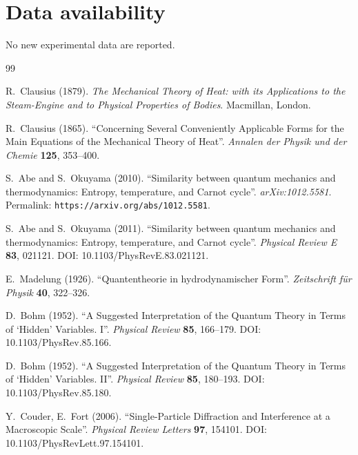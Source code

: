 \documentclass[pdflatex,sn-mathphys-num]{revtex4-2}
\begin{document}
    \backmatter

    \section*{Data availability}
    No new experimental data are reported.

    \begin{thebibliography}{99}

        R.~Clausius (1879).
        \textit{The Mechanical Theory of Heat: with its Applications to the Steam-Engine and to Physical Properties of Bodies}.
        Macmillan, London.

        R.~Clausius (1865).
        ``Concerning Several Conveniently Applicable Forms for the Main Equations of the Mechanical Theory of Heat''.
        \textit{Annalen der Physik und der Chemie} \textbf{125}, 353--400.

        S.~Abe and S.~Okuyama (2010).
        ``Similarity between quantum mechanics and thermodynamics: Entropy, temperature, and Carnot cycle''.
        \textit{arXiv:1012.5581}.
        Permalink: \texttt{https://arxiv.org/abs/1012.5581}.

        S.~Abe and S.~Okuyama (2011).
        ``Similarity between quantum mechanics and thermodynamics: Entropy, temperature, and Carnot cycle''.
        \textit{Physical Review E} \textbf{83}, 021121.
        DOI: 10.1103/PhysRevE.83.021121.

        E.~Madelung (1926).
        ``Quantentheorie in hydrodynamischer Form''.
        \textit{Zeitschrift f\"ur Physik} \textbf{40}, 322--326.

        D.~Bohm (1952).
        ``A Suggested Interpretation of the Quantum Theory in Terms of `Hidden' Variables. I''.
        \textit{Physical Review} \textbf{85}, 166--179.
        DOI: 10.1103/PhysRev.85.166.

        D.~Bohm (1952).
        ``A Suggested Interpretation of the Quantum Theory in Terms of `Hidden' Variables. II''.
        \textit{Physical Review} \textbf{85}, 180--193.
        DOI: 10.1103/PhysRev.85.180.

        Y.~Couder, E.~Fort (2006).
        ``Single-Particle Diffraction and Interference at a Macroscopic Scale''.
        \textit{Physical Review Letters} \textbf{97}, 154101.
        DOI: 10.1103/PhysRevLett.97.154101.


\end{thebibliography}
\end{document}
